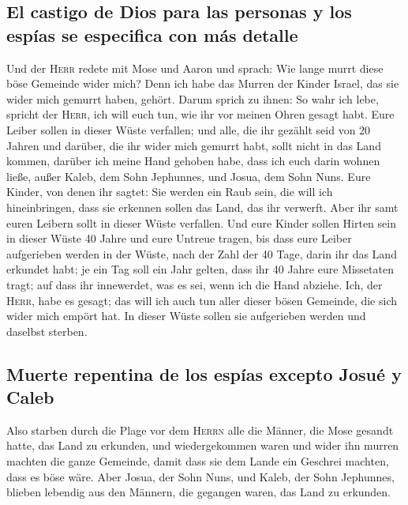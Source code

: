 \hypertarget{el-castigo-de-dios-para-las-personas-y-los-espuxedas-se-especifica-con-muxe1s-detalle}{%
\subsection{El castigo de Dios para las personas y los espías se
especifica con más
detalle}\label{el-castigo-de-dios-para-las-personas-y-los-espuxedas-se-especifica-con-muxe1s-detalle}}

 Und der \textsc{Herr} redete mit Mose und Aaron und
sprach:  Wie lange murrt diese böse Gemeinde wider mich?
Denn ich habe das Murren der Kinder Israel, das sie wider mich gemurrt
haben, gehört.  Darum sprich zu ihnen: So wahr ich lebe,
spricht der \textsc{Herr}, ich will euch tun, wie ihr vor meinen Ohren
gesagt habt.  Eure Leiber sollen in dieser Wüste
verfallen; und alle, die ihr gezählt seid von 20 Jahren und darüber, die
ihr wider mich gemurrt habt,  sollt nicht in das Land
kommen, darüber ich meine Hand gehoben habe, dass ich euch darin wohnen
ließe, außer Kaleb, dem Sohn Jephunnes, und Josua, dem Sohn Nuns.
 Eure Kinder, von denen ihr sagtet: Sie werden ein Raub
sein, die will ich hineinbringen, dass sie erkennen sollen das Land, das
ihr verwerft.  Aber ihr samt euren Leibern sollt in
dieser Wüste verfallen.  Und eure Kinder sollen Hirten
sein in dieser Wüste 40 Jahre und eure Untreue tragen, bis dass eure
Leiber aufgerieben werden in der Wüste,  nach der Zahl
der 40 Tage, darin ihr das Land erkundet habt; je ein Tag soll ein Jahr
gelten, dass ihr 40 Jahre eure Missetaten tragt; auf dass ihr
innewerdet, was es sei, wenn ich die Hand abziehe.  Ich,
der \textsc{Herr}, habe es gesagt; das will ich auch tun aller dieser
bösen Gemeinde, die sich wider mich empört hat. In dieser Wüste sollen
sie aufgerieben werden und daselbst sterben.

\hypertarget{muerte-repentina-de-los-espuxedas-excepto-josuuxe9-y-caleb}{%
\subsection{Muerte repentina de los espías excepto Josué y
Caleb}\label{muerte-repentina-de-los-espuxedas-excepto-josuuxe9-y-caleb}}

 Also starben durch die Plage vor dem \textsc{Herrn} alle
die Männer, die Mose gesandt hatte, das Land zu erkunden, und
wiedergekommen waren und wider ihn murren machten die ganze Gemeinde,
 damit dass sie dem Lande ein Geschrei machten, dass es
böse wäre.  Aber Josua, der Sohn Nuns, und Kaleb, der
Sohn Jephunnes, blieben lebendig aus den Männern, die gegangen waren,
das Land zu erkunden.

